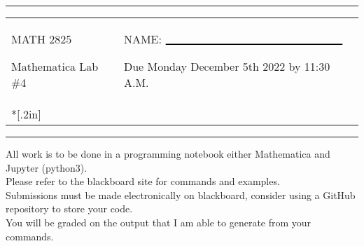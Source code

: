 \documentclass[11pt]{article}
\begin{document}
\newcommand{\dsp}{\displaystyle}
\newcommand{\ihat}{{\bf{i}}}
\newcommand{\jhat}{{\bf{j}}}
\newcommand{\khat}{{\bf{k}}}
\newcommand{\Fhat}{{\bf{F}}}

\thispagestyle{empty}

\noindent
\sffamily
\begin{center}
\rule{7.5in}{2pt}

\vspace{.2in}

\begin{tabular}{p{4in}p{3.5in}}
MATH 2825

\vspace{.2in}

Mathematica Lab \#4
& 
NAME:  $_{\rule{2.5in}{1pt}}$

\vspace{.2in}

Due Monday December 5th 2022 by 11:30 A.M.
\\*[.2in]
\end{tabular}
\rule{7.5in}{2pt}

\vspace{.1in}
All work is to be done in a programming notebook either Mathematica and Jupyter (python3).  \\
 Please refer to the blackboard site for commands and examples. \\
 Submissions must be made electronically on blackboard, consider using a GitHub repository to store your code. \\
   You will be graded on the output that I am able to generate from your commands.
\end{center}
\end{document}

